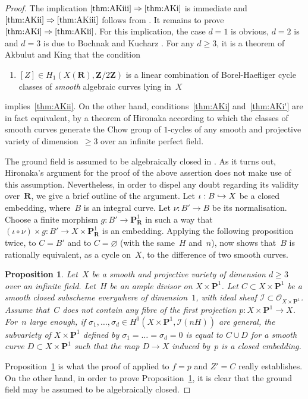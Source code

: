 \documentclass[JEP,XML,SOM,Unicode]{cedram}
\renewcommand{\theenumi}{\roman{enumi}}
\newcommand\hto{\mathrel{\lhook\joinrel\to}}
\newcommand\implique{\mathchoice{\implies}{\Rightarrow}{\Rightarrow}{\Rightarrow}}
\theoremstyle{plain}
\newtheorem{prop}[thm]{Proposition}
\theoremstyle{definition}
\numberwithin{equation}{section}
\newcommand{\sI}{{\mathscr I}}
\newcommand{\sO}{{\mathscr O}}
\renewcommand{\P}{{\mathbf P}}
\newcommand{\R}{{\mathbf R}}
\newcommand{\Z}{{\mathbf Z}}
\begin{document}
\begin{proof}
The implication $\eqref{thm:AKiii}\implique\eqref{thm:AKi}$ is immediate and $\eqref{thm:AKii}\implique\eqref{thm:AKiii}$ follows from
\cite[Prop.\,4.4.4]{Wall}. It remains to prove $\eqref{thm:AKi}\implique\eqref{thm:AKii}$.
For this implication, the case $d=1$ is obvious, $d=2$ is \cite[Th.\,12.4.11]{bcr} and $d=3$ is due to
Bochnak and Kucharz \cite[Th.\,1.1]{bochnakkucharz}.
For any $d\geq 3$, it is a theorem of Akbulut and King \cite[Prop.\,2 \& Rem.]{AkbulutKing}
that the condition
\begin{enumerate}\renewcommand{\theenumi}{\roman{enumi}$'$}
\item\label{thm:AKi'} $[Z]\in H_1(X(\R),\Z/2\Z)$ is a linear combination of Borel-Haefliger cycle classes
of \emph{smooth} algebraic curves lying in~$X$
\end{enumerate}
implies~\eqref{thm:AKii}. On the other hand,
conditions~\eqref{thm:AKi} and~\eqref{thm:AKi'} are in fact equivalent, by a theorem
of Hironaka \cite{hironakasmoothing} according to which the classes of smooth curves generate
the Chow group of $1$\nobreakdash-cycles
of any smooth and projective
variety of dimension~$\geq 3$ over an infinite perfect field.

The ground field is assumed
to be algebraically closed
in \cite[p.\,50, Th.]{hironakasmoothing}.
As it turns out, Hironaka's argument for the proof of the above assertion
does not make use of this assumption.
Nevertheless, in order to dispel any doubt regarding its validity
over~$\R$, we give a brief outline of the argument.
Let $\iota:B \hto X$ be a closed embedding, where~$B$ is an integral curve.
Let $\nu:B'\to B$
be its normalisation.
Choose a finite morphism $g:B' \to \P^1_\R$ in such a way that
$(\iota\circ \nu)\times g: B' \to X \times \P^1_\R$ is an embedding.
Applying the following proposition
twice, to $C=B'$ and to $C=\varnothing$ (with the same~$H$ and~$n$),
now shows that~$B$ is rationally equivalent, as a cycle on~$X$,
to the difference of two smooth curves.

\begin{prop}
\label{prop:hironaka51}
Let~$X$ be a smooth and projective variety of dimension $d\geq 3$ over an infinite field.
Let~$H$ be an ample divisor on $X \times \P^1$.
Let $C \subset X \times \P^1$ be a smooth closed subscheme everywhere of dimension~$1$,
with ideal sheaf $\sI \subset \sO_{X \times \P^1}$.
Assume that~$C$ does not contain any fibre of the first projection $p:X \times \P^1 \to X$.
For~$n$ large enough,
if $\sigma_1,\dots,\sigma_d \in H^0(X \times \P^1, \sI(nH))$ are general,
the subvariety of $X \times \P^1$ defined by $\sigma_1=\dots=\sigma_d=0$
is equal to $C \cup D$ for a smooth curve $D \subset X \times \P^1$
such that the map $D \to X$ induced by~$p$ is a closed embedding.
\end{prop}

Proposition~\ref{prop:hironaka51}
is what the proof of \cite[Th.\,5.1]{hironakasmoothing}
applied to $f=p$ and $Z'=C$
really establishes.
On the other hand,
in order to prove Proposition~\ref{prop:hironaka51}, it is clear that
the ground field may be assumed to be algebraically closed.
\end{proof}
\end{document}
